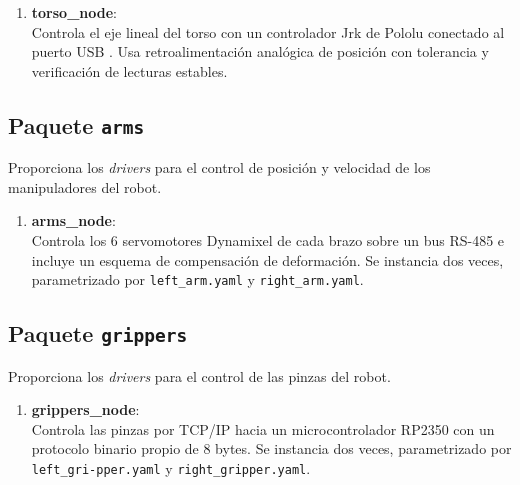 \begin{enumerate}

\item \textbf{torso\_node}: \\
Controla el eje lineal del torso con un controlador Jrk de Pololu conectado al puerto USB . Usa retroalimentación analógica de posición con tolerancia y verificación de lecturas estables.

\end{enumerate}

\subsection{Paquete \texttt{arms}}

Proporciona los \textit{drivers} para el control de posición y velocidad de los manipuladores del robot.

\begin{enumerate}

\item \textbf{arms\_node}: \\
Controla los 6 servomotores Dynamixel de cada brazo sobre un bus RS-485 e incluye un esquema de compensación de deformación. Se instancia dos veces, parametrizado por \texttt{left\_arm.yaml} y \texttt{right\_arm.yaml}.

\end{enumerate}

\subsection{Paquete \texttt{grippers}}

Proporciona los \textit{drivers} para el control de las pinzas del robot.

\begin{enumerate}

\item \textbf{grippers\_node}: \\
Controla las pinzas por TCP/IP hacia un microcontrolador RP2350 con un protocolo binario propio de 8 bytes. Se instancia dos veces, parametrizado por \texttt{left\_gri-\allowbreak{}pper.yaml} y \texttt{right\_gripper.yaml}.

\end{enumerate}

